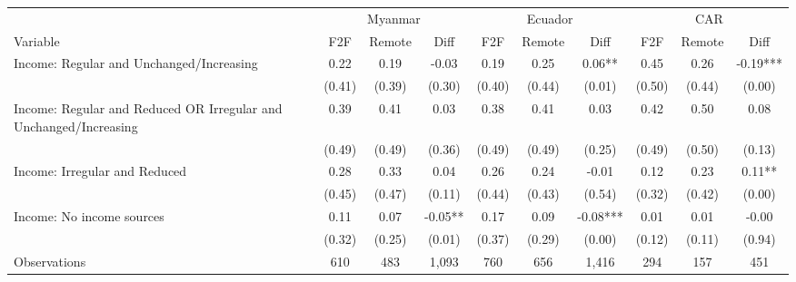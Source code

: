 \begin{tabular}{l*{9}c}
\hline\hline
 & \multicolumn{3}{c}{Myanmar} & \multicolumn{3}{c}{Ecuador} & \multicolumn{3}{c}{CAR}\\ 
Variable & F2F & Remote & Diff & F2F & Remote & Diff & F2F & Remote & Diff \\
\hline
Income: Regular and Unchanged/Increasing&0.22&0.19&-0.03&0.19&0.25&0.06**&0.45&0.26&-0.19***\\
&(0.41)&(0.39)&(0.30)&(0.40)&(0.44)&(0.01)&(0.50)&(0.44)&(0.00)\\
Income: Regular and Reduced OR Irregular and Unchanged/Increasing&0.39&0.41&0.03&0.38&0.41&0.03&0.42&0.50&0.08\\
&(0.49)&(0.49)&(0.36)&(0.49)&(0.49)&(0.25)&(0.49)&(0.50)&(0.13)\\
Income: Irregular and Reduced&0.28&0.33&0.04&0.26&0.24&-0.01&0.12&0.23&0.11**\\
&(0.45)&(0.47)&(0.11)&(0.44)&(0.43)&(0.54)&(0.32)&(0.42)&(0.00)\\
Income: No income sources&0.11&0.07&-0.05**&0.17&0.09&-0.08***&0.01&0.01&-0.00\\
&(0.32)&(0.25)&(0.01)&(0.37)&(0.29)&(0.00)&(0.12)&(0.11)&(0.94)\\
\hline
Observations & 610 & 483 & 1,093 & 760 & 656 & 1,416 & 294 & 157 & 451 \\
\hline\hline
\end{tabular}
